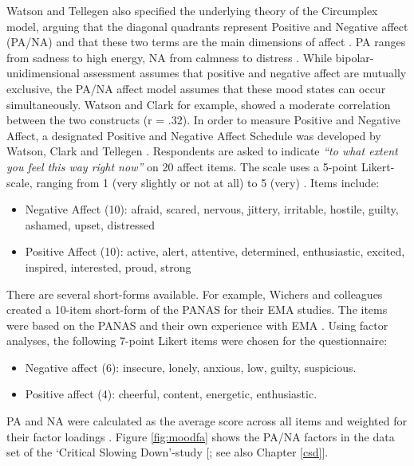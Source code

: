 \documentclass[]{book}
\providecommand{\tightlist}{%
  \setlength{\itemsep}{0pt}\setlength{\parskip}{0pt}}
\begin{document}
Watson and Tellegen \citep{watson1985} also specified the underlying
theory of the Circumplex model, arguing that the diagonal quadrants
represent Positive and Negative affect (PA/NA) and that these two terms
are the main dimensions of affect \citep{Watson1999}. PA ranges from
sadness to high energy, NA from calmness to distress \citep{Watson1988}.
While bipolar-unidimensional assessment assumes that positive and
negative affect are mutually exclusive, the PA/NA affect model assumes
that these mood states can occur simultaneously. Watson and Clark
\citep{Watson1997} for example, showed a moderate correlation between
the two constructs (r = .32). In order to measure Positive and Negative
Affect, a designated Positive and Negative Affect Schedule was developed
by Watson, Clark and Tellegen \citep{Watson1988}. Respondents are asked
to indicate \emph{``to what extent you feel this way right now''} on 20
affect items. The scale uses a 5-point Likert-scale, ranging from 1
(very slightly or not at all) to 5 (very) \citep{Watson1999}. Items
include:

\begin{itemize}
\tightlist
\item
  Negative Affect (10): afraid, scared, nervous, jittery, irritable,
  hostile, guilty, ashamed, upset, distressed
\item
  Positive Affect (10): active, alert, attentive, determined,
  enthusiastic, excited, inspired, interested, proud, strong
\end{itemize}

There are several short-forms available. For example, Wichers and
colleagues created a 10-item short-form of the PANAS for their EMA
studies. The items were based on the PANAS and their own experience with
EMA \citep{Wichers2012}. Using factor analyses, the following 7-point
Likert items were chosen for the questionnaire:

\begin{itemize}
\tightlist
\item
  Negative affect (6): insecure, lonely, anxious, low, guilty,
  suspicious.
\item
  Positive affect (4): cheerful, content, energetic, enthusiastic.
\end{itemize}

PA and NA were calculated as the average score across all items and
weighted for their factor loadings \citep{Wichers2012}. Figure
\ref{fig:moodfa} shows the PA/NA factors in the data set of the
`Critical Slowing Down'-study {[}\citet{VandeLeemput2014}; see also
Chapter \ref{csd}{]}.
\end{document}
